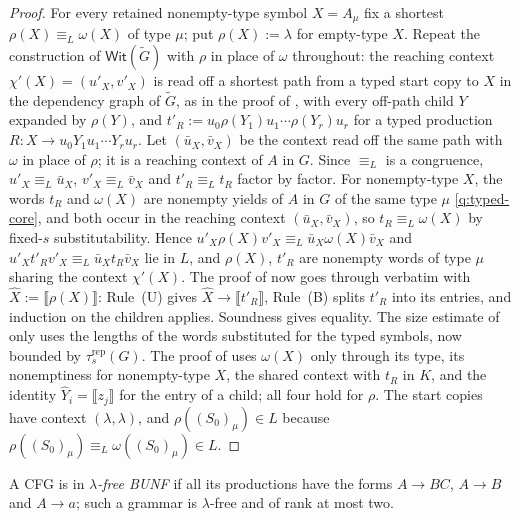\documentclass[11pt]{article}
\numberwithin{equation}{section}
\theoremstyle{plain}
\theoremstyle{definition}
\theoremstyle{remark}
\theoremstyle{plain}
\newcommand{\WitnessSet}{\mathsf{Wit}}
\newcommand{\NT}[1]{\llbracket #1\rrbracket}
\begin{document}
\begin{proof}
For every retained nonempty-type symbol $X=A_\mu$ fix a shortest
$\rho(X)\equiv_L\omega(X)$ of type $\mu$; put $\rho(X):=\lambda$ for empty-type
$X$.  Repeat the construction of $\WitnessSet(\widetilde G)$
\cite[\S5.1, eq.~(2)]{kuriyamaCFG} with $\rho$ in place of $\omega$ throughout:
the reaching context $\chi'(X)=(u'_X,v'_X)$ is read off a shortest path from a typed
start copy to $X$ in the dependency graph of $\widetilde G$, as in the proof of
\cite[Lemma~6.2]{kuriyamaCFG}, with every off-path child $Y$ expanded by
$\rho(Y)$, and
$t'_R:=u_0\rho(Y_1)u_1\cdots\rho(Y_r)u_r$ for a typed production
$R:X\to u_0Y_1u_1\cdots Y_ru_r$.  Let $(\bar u_X,\bar v_X)$ be the context read off the same path with $\omega$ in place of
$\rho$; it is a reaching context of $A$ in $G$.  Since $\equiv_L$ is a
congruence, $u'_X\equiv_L\bar u_X$, $v'_X\equiv_L\bar v_X$ and $t'_R\equiv_Lt_R$ factor by
factor.  For nonempty-type $X$, the words $t_R$ and $\omega(X)$ are nonempty yields
of $A$ in $G$ of the same type $\mu$ \ref{q:typed-core}, and both occur in the reaching context
$(\bar u_X,\bar v_X)$, so $t_R\equiv_L\omega(X)$ by fixed-$s$ substitutability.  Hence
$u'_X\rho(X)v'_X\equiv_L\bar u_X\omega(X)\bar v_X$ and $u'_Xt'_Rv'_X\equiv_L\bar u_Xt_R\bar v_X$ lie in $L$, and $\rho(X)$, $t'_R$ are nonempty
words of type $\mu$ sharing the context $\chi'(X)$.  The proof of
\cite[Theorem~5.2]{kuriyamaCFG} now goes through verbatim with
$\widehat X:=\NT{\rho(X)}$: Rule~(U) gives $\widehat X\to\NT{t'_R}$, Rule~(B) splits
$t'_R$ into its entries, and induction on the children applies.  Soundness
\cite[Theorem~4.2]{kuriyamaCFG} gives equality.  The size estimate of
\cite[Lemma~6.2]{kuriyamaCFG} only uses the lengths of the words substituted
for the typed symbols, now bounded by $\tau^{\mathrm{rep}}_s(G)$.
The proof of \cite[Theorem~5.2]{kuriyamaCFG} uses $\omega(X)$ only through
its type, its nonemptiness for nonempty-type $X$, the shared context with
$t_R$ in $K$, and the identity $\widehat Y_i=\NT{z_j}$ for the entry of a child;
all four hold for $\rho$.  The start copies have context $(\lambda,\lambda)$, and
$\rho((S_0)_\mu)\in L$ because $\rho((S_0)_\mu)\equiv_L\omega((S_0)_\mu)\in L$.
\end{proof}

A CFG is in \emph{$\lambda$-free BUNF} if all its productions have the forms
$A\to BC$, $A\to B$ and $A\to a$; such a grammar is $\lambda$-free and of rank at most two.
\end{document}
